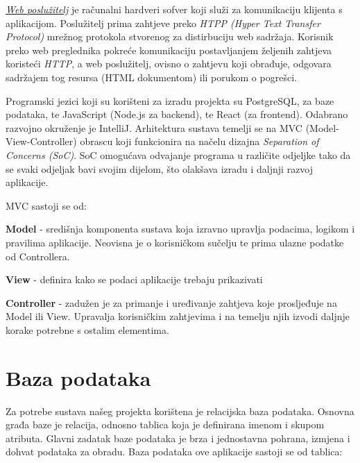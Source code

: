 		\textit{\underline{Web poslužitelj}} je računalni hardveri sofver koji služi za komunikaciju klijenta s aplikacijom. Poslužitelj prima zahtjeve preko \textit{HTPP (Hyper Text Transfer Protocol)} mrežnog protokola stvorenog za distirbuciju web sadržaja. Korisnik preko web preglednika pokreće komunikaciju postavljanjem željenih zahtjeva koristeći \textit{HTTP}, a web poslužitelj, ovisno o zahtjevu koji obrađuje, odgovara sadržajem tog resursa (HTML dokumentom) ili porukom o pogrešci.
		
		Programski jezici koji su korišteni za izradu projekta su PostgreSQL, za baze podataka, te JavaScript (Node.js za backend), te React (za frontend). Odabrano razvojno okruženje je IntelliJ. Arhitektura sustava temelji se na MVC (Model-View-Controller) obrascu koji funkcionira na načelu dizajna \textit{Separation of Concerns (SoC)}. SoC omogućava odvajanje programa u različite odjeljke tako da se svaki odjeljak bavi svojim dijelom, što olakšava izradu i daljnji razvoj aplikacije.
		
		MVC sastoji se od:
		\begin{packed_item}
			\item \textbf{Model} - središnja komponenta sustava koja izravno upravlja podacima, logikom i pravilima aplikacije. Neovisna je o korisničkom sučelju te prima ulazne podatke od Controllera.
			
			\item \textbf{View} - definira kako se podaci aplikacije trebaju prikazivati
			
			\item \textbf{Controller} - zadužen je za primanje i uređivanje zahtjeva koje prosljeđuje na Model ili View. Upravalja korisničkim zahtjevima i na temelju njih izvodi daljnje korake potrebne s ostalim elementima.
		\end{packed_item}
		
		\eject
		

				
		\section{Baza podataka}
			
%			

			Za potrebe sustava našeg projekta korištena je relacijska baza podataka. Osnovna građa baze je relacija, odnosno tablica koja je definirana imenom i skupom atributa. Glavni zadatak baze podataka je brza i jednostavna pohrana, izmjena i dohvat podataka za obradu. Baza podataka ove aplikacije sastoji se od tablica:
			
